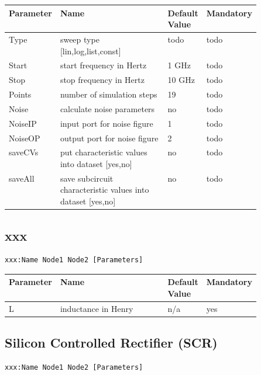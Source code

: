 \begin{tabular}{|l|p{0.5\linewidth}|l|l|}
\hline
Parameter & Name & Default Value & Mandatory \\
\hline
Type & sweep type [lin,log,list,const] & todo & todo \\
Start & start frequency in Hertz & 1 GHz & todo \\
Stop & stop frequency in Hertz & 10 GHz & todo \\
Points & number of simulation steps & 19 & todo \\
Noise & calculate noise parameters & no & todo \\
NoiseIP & input port for noise figure & 1 & todo \\
NoiseOP & output port for noise figure & 2 & todo \\
saveCVs & put characteristic values into dataset [yes,no] & no & todo \\
saveAll & save subcircuit characteristic values into dataset [yes,no] & no & todo \\
\hline
\end{tabular}







\subsection{xxx}

\begin{verbatim}
xxx:Name Node1 Node2 [Parameters]
\end{verbatim}


\begin{tabular}{|l|p{0.5\linewidth}|l|l|}
\hline
Parameter & Name & Default Value & Mandatory \\
\hline
L & inductance in Henry & n/a & yes \\
\hline
\end{tabular}




\subsection{Silicon Controlled Rectifier (SCR)}

\begin{verbatim}
xxx:Name Node1 Node2 [Parameters]
\end{verbatim}


